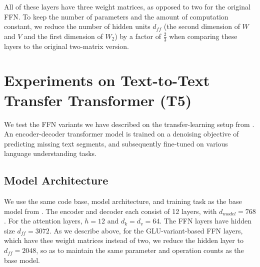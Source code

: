 \documentclass{article}
\begin{document}
All of these layers have three weight matrices, as opposed to two for the original FFN.  To keep the number of parameters and the amount of computation constant, we reduce the number of hidden units $d_{ff}$ (the second dimension of $W$ and $V$ and the first dimension of $W_2$) by a factor of $\frac{2}{3}$ when comparing these layers to the original two-matrix version.

\section{Experiments on Text-to-Text Transfer Transformer (T5)}

We test the FFN variants we have described on the transfer-learning setup from \citep{raffel2019exploring}.  An encoder-decoder transformer model \citep{Vas17} is trained on a denoising objective of predicting missing text segments, and subsequently fine-tuned on various language understanding tasks.  

\subsection{Model Architecture}

We use the same code base, model architecture, and training task as the base model from \citep{raffel2019exploring}.  The encoder and decoder each consist of 12 layers, with $d_{model}=768$.  For the attention layers,  $h=12$ and $d_k = d_v = 64$.   The FFN layers have hidden size $d_{ff}=3072$.  As we describe above, for the GLU-variant-based FFN layers, which have thee weight matrices instead of two, we reduce the hidden layer to $d_{ff}=2048$, so as to maintain the same parameter and operation counts as the base model.
\end{document}
